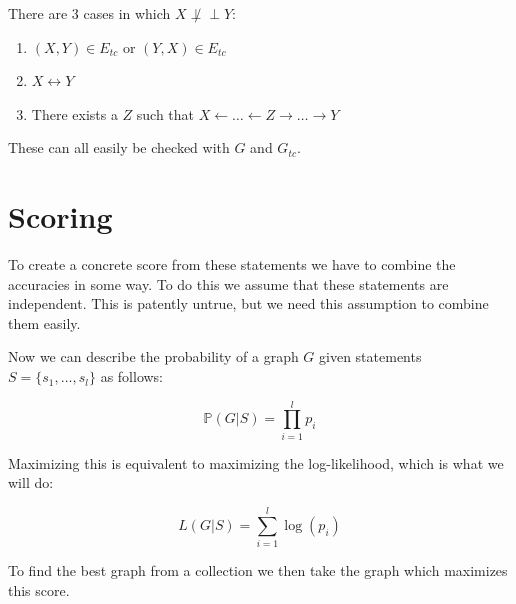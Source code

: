 \documentclass[11pt,a4paper]{report}
\def\ci{\perp\!\!\!\perp}
\begin{document}
There are 3 cases in which $X \not \ci Y$:
\begin{enumerate}
  \item $(X, Y) \in E_{tc}$ or $(Y, X) \in E_{tc}$

  \item $X \leftrightarrow Y$

  \item There exists a $Z$ such that $X \leftarrow \ldots \leftarrow Z
    \rightarrow \ldots \rightarrow Y$
\end{enumerate}
These can all easily be checked with $G$ and $G_{tc}$.

\section{Scoring}\label{sec:scoring}
To create a concrete score from these statements we have to combine the
accuracies in some way. To do this we assume that these statements are
independent. This is patently untrue, but we need this assumption to
combine them easily.

Now we can describe the probability of a graph $G$ given statements $S =
\{s_1, \ldots, s_l\}$ as follows:

\begin{equation*}
  \mathbb{P}(G | S) = \prod ^l_{i=1} p_i
\end{equation*}

Maximizing this is equivalent to maximizing the log-likelihood, which is
what we will do:

\begin{equation*}
  L(G|S) = \sum_{i=1}^l \log (p_i)
\end{equation*}

To find the best graph from a collection we then take the graph which
maximizes this score.
\end{document}
